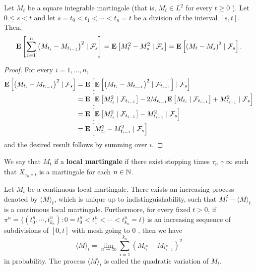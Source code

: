 	\begin{lemma}
		Let $M_t$ be a square integrable martingale (that is, $M_t \in L^2$ for every $t \geq 0$ ). Let $0 \leq s<t$ and let $s=t_0<t_1<\cdots<t_n=t$ be a division of the interval $[s, t]$. Then,
		$$
		{\mathbf E}\left[\sum_{i=1}^n\left(M_{t_i}-M_{t_{i-1}}\right)^2 \mid \mathcal{F}_s\right]={\mathbf E}\left[M_t^2-M_s^2 \mid \mathcal{F}_s\right]={\mathbf E}\left[\left(M_t-M_s\right)^2 \mid \mathcal{F}_s\right] .
		$$
	\end{lemma}
	\begin{proof}
		For every $i=1, \ldots, n$,
		$$
		\begin{aligned}
			{\mathbf E} \left[ \left(M_{t_i}-M_{t_{i-1}}\right)^2 \mid \mathcal{F}_s\right] & ={\mathbf E}\left[{\mathbf E} \left[\left(M_{t_i}-M_{t_{i-1}}\right)^2 \mid \mathcal{F}_{t_{i-1}}\right] \mid \mathcal{F}_s\right] \\
			& ={\mathbf E}\left[{\mathbf E}\left[M_{t_i}^2 \mid \mathcal{F}_{t_{i-1}}\right]-2 M_{t_{i-1}} {\mathbf E}\left[M_{t_i} \mid \mathcal{F}_{t_{i-1}}\right]+M_{t_{i-1}}^2 \mid \mathcal{F}_s\right] \\
			& ={\mathbf E}\left[{\mathbf E}\left[M_{t_i}^2 \mid \mathcal{F}_{t_{i-1}}\right]-M_{t_{i-1}}^2 \mid \mathcal{F}_s\right] \\
			& ={\mathbf E}\left[M_{t_i}^2-M_{t_{i-1}}^2 \mid \mathcal{F}_s\right]
		\end{aligned}
		$$
		and the desired result follows by summing over $i$. 
	\end{proof}
	
	We say that $M_t$ if a {\bf local martingale} if there exist stopping times $\tau_n\uparrow \infty$ such that $X_{\tau_n\wedge t}$ is a martingale for each $n\in {\mathbb N}$.
	\begin{theorem}\label{Thm:quadratic}
		Let $M_t$ be a continuous local martingale. There exists an increasing process denoted by $\langle M \rangle_t$, which is unique up to indistinguishability, such that $M_t^2-\langle M\rangle_t$ is a continuous local martingale. Furthermore, for every fixed $t>0$, if $\pi^n=\{(t_0^n,\cdots, t_{k_n}^n): 0=t_0^n<t_1^n<\cdots<t_{k_n}^n=t\}$ is an increasing sequence of subdivisions of $[0, t]$ with mesh going to 0 , then we have
		$$
		\langle  M\rangle_t=\lim _{n \rightarrow \infty} \sum_{i=1}^{k_n}\left(M_{t_i^n}-M_{t_{i-1}^n}\right)^2
		$$
		in probability. The process $\langle M\rangle_t$ is called the quadratic variation of $M_t $. 
	\end{theorem}

